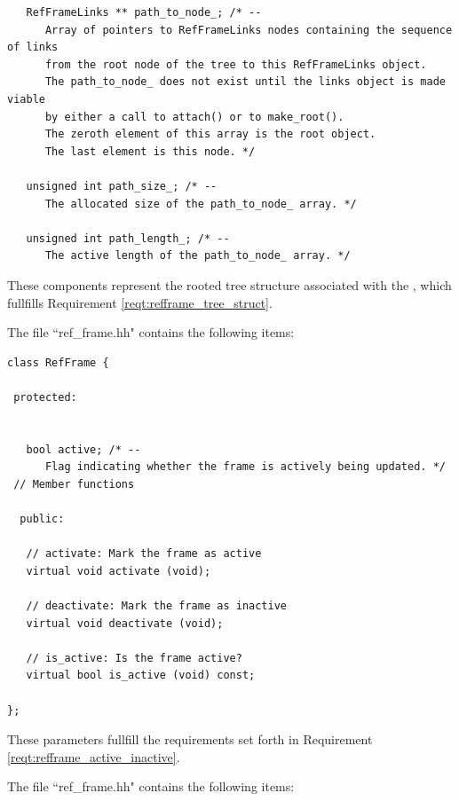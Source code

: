 \begin{verbatim}
   RefFrameLinks ** path_to_node_; /* --
      Array of pointers to RefFrameLinks nodes containing the sequence of links
      from the root node of the tree to this RefFrameLinks object.
      The path_to_node_ does not exist until the links object is made viable
      by either a call to attach() or to make_root().
      The zeroth element of this array is the root object.
      The last element is this node. */

   unsigned int path_size_; /* --
      The allocated size of the path_to_node_ array. */

   unsigned int path_length_; /* --
      The active length of the path_to_node_ array. */

\end{verbatim}

These components represent the rooted tree structure associated with the
, which fullfills Requirement \ref{reqt:refframe_tree_struct}.

\label{inspect:refframe_active_inactive}

The file ``ref\_frame.hh" contains the following items:

\begin{verbatim}
class RefFrame {

 protected:


   bool active; /* --
      Flag indicating whether the frame is actively being updated. */
 // Member functions

  public:

   // activate: Mark the frame as active
   virtual void activate (void);

   // deactivate: Mark the frame as inactive
   virtual void deactivate (void);

   // is_active: Is the frame active?
   virtual bool is_active (void) const;

};
\end{verbatim}

These parameters fullfill the requirements set forth in Requirement
\ref{reqt:refframe_active_inactive}.

\label{inspect:refframe_subscribe}

The file ``ref\_frame.hh" contains the following items:


